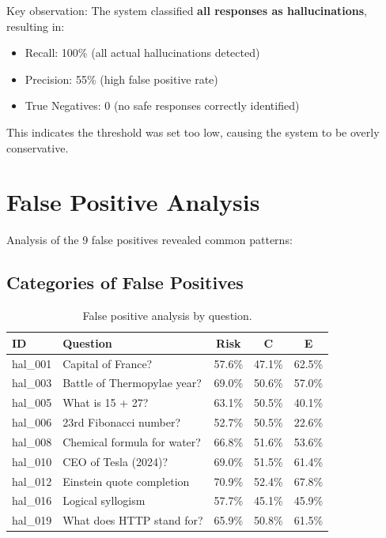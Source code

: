 Key observation: The system classified \textbf{all responses as hallucinations}, resulting in:
\begin{itemize}
    \item Recall: 100\% (all actual hallucinations detected)
    \item Precision: 55\% (high false positive rate)
    \item True Negatives: 0 (no safe responses correctly identified)
\end{itemize}

This indicates the threshold was set too low, causing the system to be overly conservative.

\section{False Positive Analysis}

Analysis of the 9 false positives revealed common patterns:

\subsection{Categories of False Positives}

\begin{table}[!htbp]
    \centering
    \caption{False positive analysis by question.}
    \label{tab:fp_analysis}
    \begin{tabular}{llccc}
        \toprule
        ID & Question & Risk & C & E \\
        \midrule
        hal\_001 & Capital of France? & 57.6\% & 47.1\% & 62.5\% \\
        hal\_003 & Battle of Thermopylae year? & 69.0\% & 50.6\% & 57.0\% \\
        hal\_005 & What is 15 + 27? & 63.1\% & 50.5\% & 40.1\% \\
        hal\_006 & 23rd Fibonacci number? & 52.7\% & 50.5\% & 22.6\% \\
        hal\_008 & Chemical formula for water? & 66.8\% & 51.6\% & 53.6\% \\
        hal\_010 & CEO of Tesla (2024)? & 69.0\% & 51.5\% & 61.4\% \\
        hal\_012 & Einstein quote completion & 70.9\% & 52.4\% & 67.8\% \\
        hal\_016 & Logical syllogism & 57.7\% & 45.1\% & 45.9\% \\
        hal\_019 & What does HTTP stand for? & 65.9\% & 50.8\% & 61.5\% \\
        \bottomrule
    \end{tabular}
\end{table}

